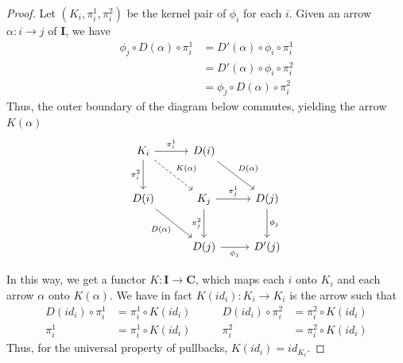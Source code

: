 \documentclass[runningheads,envcountsect]{llncs}
\newcommand{\cat}[1]{\ensuremath{\mathbf{#1}}}
\theoremstyle{plain}
\theoremstyle{definition}
\begin{document}
\begin{proof}
    Let $(K_i, \pi_i^1, \pi_i^2)$ be the kernel pair of $\phi_i$ for each $i$. Given an arrow $\alpha: i \to j$ of $\cat I$, we have
    \begin{align*}
        \phi_j \circ D(\alpha) \circ \pi_i^1 &= D'(\alpha) \circ \phi_i \circ \pi_i^1 \\
                                             &= D'(\alpha) \circ \phi_i \circ \pi_i^2 \\
                                             &= \phi_j \circ D(\alpha) \circ \pi_i^2
    \end{align*}
    Thus, the outer boundary of the diagram below commutes, yielding the arrow $K(\alpha)$
    \[
        \begin{tikzcd}[row sep=26, column sep=26]
            {K_i} \ar[r, "{\pi_i^1}"] \ar[d, "{\pi_i^2}"swap] \ar[dr, dashed, "{K(\alpha)}"] & D(i) \ar[dr, "{D(\alpha)}"] \\
            D(i) \ar[dr, "{D(\alpha)}"swap] & K_j \ar[r, "{\pi_j^1}"] \ar[d, "{\pi_j^2}"swap] & D(j) \ar[d, "{\phi_j}"] \\
            & D(j) \ar[r, "{\phi_j}"swap] & D'(j)
        \end{tikzcd}
    \]

    In this way, we get a functor $K: \cat{I \to C}$, 
    which maps each $i$ onto $K_i$ and each arrow $\alpha$ onto $K(\alpha)$. 
	We have in fact $K(id_i) : K_i \to K_i$ is the arrow such that
        \[
            \begin{split}
                D(id_i) \circ \pi_i^1 &= \pi_i^1 \circ K(id_i) \\
                \pi_i^1 &= \pi_i^1 \circ K(id_i)
            \end{split}
                \qquad
            \begin{split}
                D(id_i) \circ \pi_i^2 &= \pi_i^2 \circ K(id_i) \\
                \pi_i^2 &= \pi_i^2 \circ K(id_i)
            \end{split}
        \]
	Thus, for the universal property of pullbacks, $K(id_i) = id_{K_i}$.


\end{proof}
\end{document}
